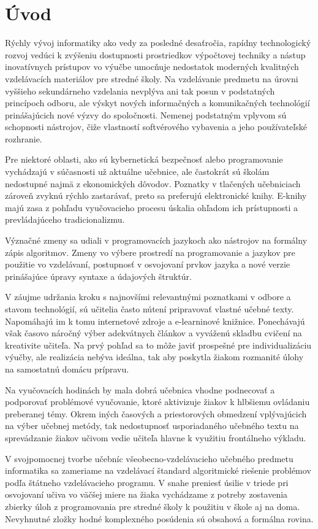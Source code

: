 \chapter{Úvod}
Rýchly vývoj informatiky ako vedy za posledné desaťročia, rapídny technologický rozvoj vedúci k zvýšeniu dostupnosti prostriedkov výpočtovej techniky a nástup inovatívnych prístupov vo výučbe umocňuje nedostatok moderných kvalitných vzdelávacích materiálov pre stredné školy. Na vzdelávanie predmetu na úrovni vyššieho sekundárneho vzdelania nevplýva ani tak posun v podstatných princípoch odboru, ale výskyt nových informačných a komunikačných technológií prinášajúcich nové výzvy do spoločnosti. Nemenej podstatným vplyvom sú schopnosti nástrojov, čiže vlastností softvérového vybavenia a jeho používateľské rozhranie.

Pre niektoré oblasti, ako sú kybernetická bezpečnosť alebo programovanie vychádzajú v súčasnosti už aktuálne učebnice, ale častokrát sú školám nedostupné najmä z ekonomických dôvodov. Poznatky v tlačených učebniciach zároveň zvyknú rýchlo zastarávať, preto sa preferujú elektronické knihy. E-knihy majú zasa z pohľadu vyučovacieho procesu úskalia ohľadom ich prístupnosti a prevládajúceho tradicionalizmu.

Význačné zmeny sa udiali v programovacích jazykoch ako nástrojov na formálny zápis algoritmov. Zmeny vo výbere prostredí na programovanie a jazykov pre použitie vo vzdelávaní, postupnosť v osvojovaní prvkov jazyka a nové verzie prinášajúce úpravy syntaxe a údajových štruktúr.

V záujme udržania kroku s najnovšími relevantnými poznatkami v odbore a stavom technológií, sú učitelia často nútení pripravovať vlastné učebné texty. Napomáhajú im k tomu internetové zdroje a e-learninové knižnice. Ponechávajú však časovo náročný výber adekvátnych článkov a vyváženú skladbu cvičení na kreativite učiteľa. Na prvý pohľad sa to môže javiť prospešné pre individualizáciu výučby, ale realizácia nebýva ideálna, tak aby poskytla žiakom rozmanité úlohy na samostatnú domácu prípravu.

Na vyučovacích hodinách by mala dobrá učebnica vhodne podnecovať a podporovať problémové vyučovanie, ktoré aktivizuje žiakov k hlbšiemu ovládaniu preberanej témy. Okrem iných časových a priestorových obmedzení vplývajúcich na výber učebnej metódy, tak nedostupnosť usporiadaného učebného textu na sprevádzanie žiakov učivom vedie učiteľa hlavne k využitiu frontálneho výkladu.

V svojpomocnej tvorbe učebníc všeobecno-vzdelávacieho učebného predmetu informatika sa zameriame na vzdelávací štandard algoritmické riešenie problémov podľa štátneho vzdelávacieho programu. V snahe preniesť úsilie v triede pri osvojovaní učiva vo väčšej miere na žiaka vychádzame z potreby zostavenia zbierky úloh z programovania pre stredné školy k použitiu v škole aj na doma. Nevyhnutné zložky hodné komplexného posúdenia sú obsahová a formálna rovina.

